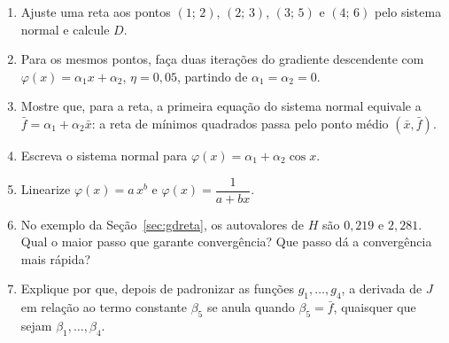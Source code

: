 \begin{enumerate}[label=\arabic*.]
  \item Ajuste uma reta aos pontos $(1;\,2)$, $(2;\,3)$, $(3;\,5)$ e $(4;\,6)$ pelo sistema normal e calcule $D$.
  \item Para os mesmos pontos, faça duas iterações do gradiente descendente com $\varphi(x)=\alpha_1x+\alpha_2$,
        $\eta=0{,}05$, partindo de $\alpha_1=\alpha_2=0$.
  \item Mostre que, para a reta, a primeira equação do sistema normal equivale a $\bar f=\alpha_1+\alpha_2\bar x$:
        a reta de mínimos quadrados passa pelo ponto médio $(\bar x,\bar f)$.
  \item Escreva o sistema normal para $\varphi(x)=\alpha_1+\alpha_2\cos x$.
  \item Linearize $\varphi(x)=a\,x^{b}$ e $\varphi(x)=\dfrac{1}{a+bx}$.
  \item No exemplo da Seção~\ref{sec:gdreta}, os autovalores de $H$ são $0{,}219$ e $2{,}281$. Qual o maior passo
        que garante convergência? Que passo dá a convergência mais rápida?
  \item Explique por que, depois de padronizar as funções $g_1,\dots,g_4$, a derivada de $J$ em relação ao termo
        constante $\beta_5$ se anula quando $\beta_5=\bar f$, quaisquer que sejam $\beta_1,\dots,\beta_4$.
\end{enumerate}

